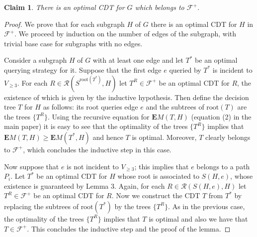\documentclass[12pt]{article}
\newtheorem{claim}{Claim}
\newcommand{\ro}[1]{\textrm{root}(#1)}
\newcommand{\EMf}[2]{\mathbf{E}M(#1,#2)}
\newcommand{\ESrecCDT}[0]{2}
\newcommand{\mainLemmaSparse}[0]{3}
\begin{document}
		\begin{claim}
			There is an optimal CDT for $G$ which belongs to $\mathcal{F}^+$.
		\end{claim}
		
		\begin{proof}
			We prove that for each subgraph $H$ of $G$ there is an optimal CDT for $H$ in $\mathcal{F}^+$. We proceed by induction on the number of edges of the subgraph, with trivial base case for subgraphs with no edges. 
			
			Consider a subgraph $H$ of $G$ with at least one edge and let $T^*$ be an optimal querying strategy for it. Suppose that the first edge $e$ queried by $T^*$ is incident to $V_{\ge 3}$. For each $R \in \mathcal{R}(S^{\ro{T^*}}, H)$ let $T^R \in \mathcal{F}^+$ be an optimal CDT for $R$, the existence of which is given by the inductive hypothesis. Then define the decision tree $T$ for $H$ as follows: its root queries edge $e$ and the subtrees of $\ro{T}$ are the trees $\{T^R\}$. Using the recursive equation for $\EMf{T}{H}$ (equation (\ESrecCDT) in the main paper) it is easy to see that the optimality of the trees $\{T^R\}$ implies that $\EMf{T}{H} \ge \EMf{T^*}{H}$ and hence $T$ is optimal. Moreover, $T$ clearly belongs to $\mathcal{F}^+$, which concludes the inductive step in this case.
			
			Now suppose that $e$ is not incident to $V_{\ge 3}$; this implies that $e$ belongs to a path $P_i$. Let $T^*$ be an optimal CDT for $H$ whose root is associated to $S(H, e)$, whose existence is guaranteed by Lemma \mainLemmaSparse. Again, for each $R \in \mathcal{R}(S(H, e), H)$ let $T^R \in \mathcal{F}^+$ be an optimal CDT for $R$. Now we construct the CDT $T$ from $T^*$ by replacing the subtrees of $\ro{T^*}$ by the trees $\{T^R\}$. As in the previous case, the optimality of the trees $\{T^R\}$ implies that $T$ is optimal and also we have that $T \in \mathcal{F}^+$. This concludes the inductive step and the proof of the lemma.
		\end{proof}
\end{document}
